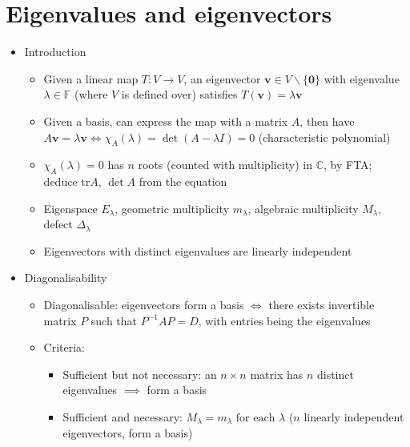 \section{Eigenvalues and eigenvectors}
\begin{itemize}
      \item Introduction
            \begin{itemize}
                  \item Given a linear map $T:V\to V$, an eigenvector $\mathbf{v}\in V\backslash\{\mathbf{0}\}$
                        with eigenvalue $\lambda\in\mathbb{F}$ (where $V$ is defined over)
                        satisfies $T(\mathbf{v})=\lambda\mathbf{v}$
                  \item Given a basis, can express the map with a matrix $A$, then have $A\mathbf{v}=\lambda\mathbf{v}\iff\chi_{A}(\lambda)=\det(A-\lambda I)=0$
                        (characteristic polynomial)
                  \item $\chi_{A}(\lambda)=0$ has $n$ roots (counted with multiplicity)
                        in $\mathbb{C}$, by FTA; deduce $\textrm{tr}A$, $\det A$ from the
                        equation
                  \item Eigenspace $E_{\lambda}$, geometric multiplicity $m_{\lambda}$,
                        algebraic multiplicity $M_{\lambda}$, defect $\Delta_{\lambda}$
                  \item Eigenvectors with distinct eigenvalues are linearly independent
            \end{itemize}
      \item Diagonalisability
            \begin{itemize}
                  \item Diagonalisable: eigenvectors form a basis $\iff$ there exists invertible
                        matrix $P$ such that $P^{-1}AP=D$, with entries being the eigenvalues
                  \item Criteria:
                        \begin{itemize}
                              \item Sufficient but not necessary: an $n\times n$ matrix has $n$ distinct
                                    eigenvalues $\implies$ form a basis
                              \item Sufficient and necessary: $M_{\lambda}=m_{\lambda}\textrm{ for each }\lambda$
                                    ($n$ linearly independent eigenvectors, form a basis)
                        \end{itemize}

\end{itemize}
\end{itemize}

